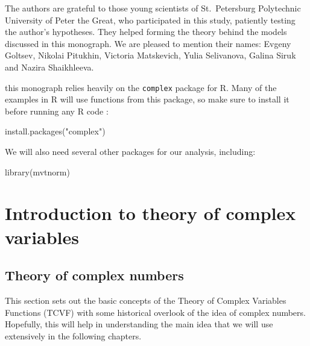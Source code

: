 \documentclass[
]{book}
\newenvironment{Shaded}{\begin{snugshade}}{\end{snugshade}}
\newcommand{\FunctionTok}[1]{\textcolor[rgb]{0.00,0.00,0.00}{#1}}
\newcommand{\NormalTok}[1]{#1}
\newcommand{\StringTok}[1]{\textcolor[rgb]{0.31,0.60,0.02}{#1}}
\begin{document}
The authors are grateful to those young scientists of St.~Petersburg Polytechnic University of Peter the Great, who participated in this study, patiently testing the author's hypotheses. They helped forming the theory behind the models discussed in this monograph. We are pleased to mention their names: Evgeny Goltsev, Nikolai Pitukhin, Victoria Matskevich, Yulia Selivanova, Galina Siruk and Nazira Shaikhleeva.

this monograph relies heavily on the \texttt{complex} package for R. Many of the examples in R will use functions from this package, so make sure to install it before running any R code \citep{R-complex}:

\begin{Shaded}
\begin{Highlighting}[]
\FunctionTok{install.packages}\NormalTok{(}\StringTok{"complex"}\NormalTok{)}
\end{Highlighting}
\end{Shaded}

We will also need several other packages for our analysis, including:

\begin{Shaded}
\begin{Highlighting}[]
\FunctionTok{library}\NormalTok{(mvtnorm)}
\end{Highlighting}
\end{Shaded}

\hypertarget{intro}{%
\chapter{Introduction to theory of complex variables}\label{intro}}

\hypertarget{theoryOfComplexNumbers}{%
\section{Theory of complex numbers}\label{theoryOfComplexNumbers}}

This section sets out the basic concepts of the Theory of Complex Variables Functions (TCVF) with some historical overlook of the idea of complex numbers. Hopefully, this will help in understanding the main idea that we will use extensively in the following chapters.
\end{document}
